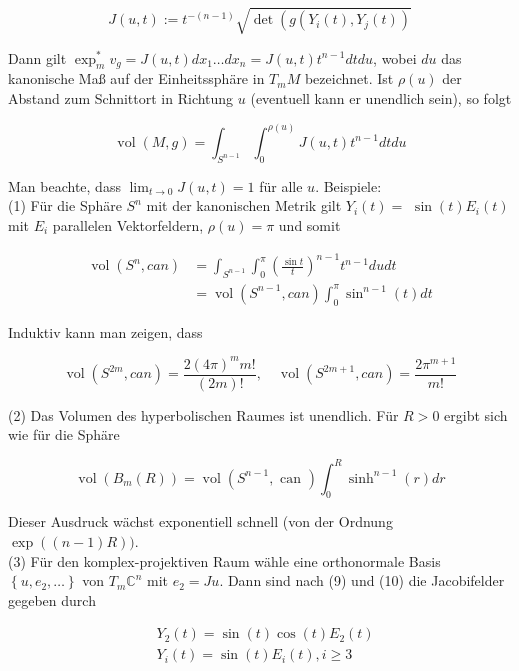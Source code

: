 \documentclass[10pt, letterpaper]{article}
\begin{document}
$$
J(u, t):=t^{-(n-1)} \sqrt{\operatorname{det}\left(g\left(Y_{i}(t), Y_{j}(t)\right)\right.}
$$

Dann gilt $\exp _{m}^{*} v_{g}=J(u, t) d x_{1} \ldots d x_{n}=J(u, t) t^{n-1} d t d u$, wobei $d u$ das kanonische Maß auf der Einheitssphäre in $T_{m} M$ bezeichnet. Ist $\rho(u)$ der Abstand zum Schnittort in Richtung $u$ (eventuell kann er unendlich sein), so folgt


\begin{equation*}
\operatorname{vol}(M, g)=\int_{S^{n-1}} \int_{0}^{\rho(u)} J(u, t) t^{n-1} d t d u \tag{11}
\end{equation*}


Man beachte, dass $\lim _{t \rightarrow 0} J(u, t)=1$ für alle $u$. Beispiele:\\
(1) Für die Sphäre $S^{n}$ mit der kanonischen Metrik gilt $Y_{i}(t)=$ $\sin (t) E_{i}(t)$ mit $E_{i}$ parallelen Vektorfeldern, $\rho(u)=\pi$ und somit

$$
\begin{aligned}
\operatorname{vol}\left(S^{n}, c a n\right) & =\int_{S^{n-1}} \int_{0}^{\pi}\left(\frac{\sin t}{t}\right)^{n-1} t^{n-1} d u d t \\
& =\operatorname{vol}\left(S^{n-1}, c a n\right) \int_{0}^{\pi} \sin ^{n-1}(t) d t
\end{aligned}
$$

Induktiv kann man zeigen, dass

$$
\operatorname{vol}\left(S^{2 m}, c a n\right)=\frac{2(4 \pi)^{m} m!}{(2 m)!}, \quad \operatorname{vol}\left(S^{2 m+1}, c a n\right)=\frac{2 \pi^{m+1}}{m!}
$$

(2) Das Volumen des hyperbolischen Raumes ist unendlich. Für $R>0$ ergibt sich wie für die Sphäre

$$
\operatorname{vol}\left(B_{m}(R)\right)=\operatorname{vol}\left(S^{n-1}, \text { can }\right) \int_{0}^{R} \sinh ^{n-1}(r) d r
$$

Dieser Ausdruck wächst exponentiell schnell (von der Ordnung $\exp ((n-1) R))$.\\
(3) Für den komplex-projektiven Raum wähle eine orthonormale Basis $\left\{u, e_{2}, \ldots\right\}$ von $T_{m} \mathbb{C}^{n}$ mit $e_{2}=J u$. Dann sind nach (9) und (10) die Jacobifelder gegeben durch

$$
\begin{aligned}
& Y_{2}(t)=\sin (t) \cos (t) E_{2}(t) \\
& Y_{i}(t)=\sin (t) E_{i}(t), i \geq 3
\end{aligned}
$$
\end{document}

